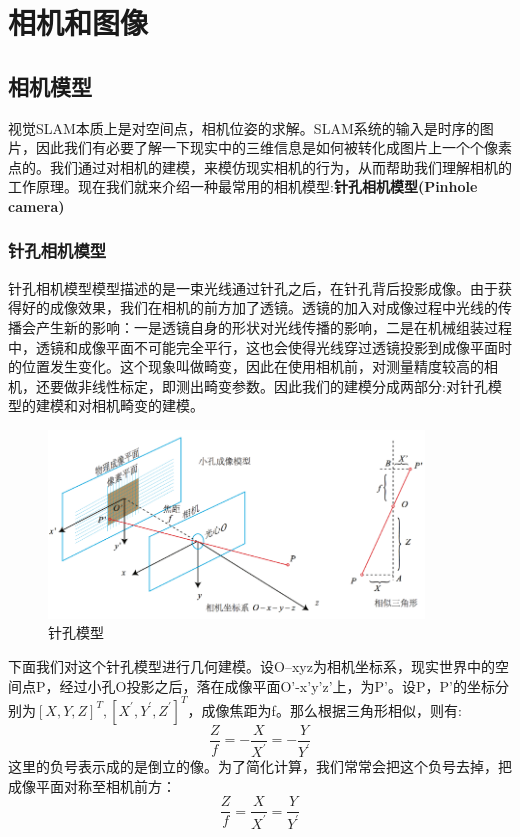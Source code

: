 \chapter{相机和图像}
\section{相机模型}
视觉SLAM本质上是对空间点，相机位姿的求解。SLAM系统的输入是时序的图片，因此我们有必要了解一下现实中的三维信息是如何被转化成图片上一个个像素点的。我们通过对相机的建模，来模仿现实相机的行为，从而帮助我们理解相机的工作原理。现在我们就来介绍一种最常用的相机模型:\textbf{针孔相机模型(Pinhole camera)}
\subsection{针孔相机模型}
针孔相机模型模型描述的是一束光线通过针孔之后，在针孔背后投影成像。由于获得好的成像效果，我们在相机的前方加了透镜。透镜的加入对成像过程中光线的传播会产生新的影响：一是透镜自身的形状对光线传播的影响，二是在机械组装过程中，透镜和成像平面不可能完全平行，这也会使得光线穿过透镜投影到成像平面时的位置发生变化。这个现象叫做畸变，因此在使用相机前，对测量精度较高的相机，还要做非线性标定，即测出畸变参数。因此我们的建模分成两部分:对针孔模型的建模和对相机畸变的建模。
\begin{figure}
	\centering
	\includegraphics[height=5cm]{figures/pinholemodule.png}
	\caption{针孔模型}
\end{figure}
下面我们对这个针孔模型进行几何建模。设O–xyz为相机坐标系，现实世界中的空间点P，经过小孔O投影之后，落在成像平面O'-x'y'z'上，为P'。设P，P'的坐标分别为$[X,Y,Z]^{T},\left[X^{\prime}, Y^{\prime}, Z^{\prime}\right]^{T}$，成像焦距为f。那么根据三角形相似，则有:
\begin{equation*}
\frac{Z}{f}=-\frac{X}{X^{\prime}}=-\frac{Y}{Y^{\prime}}
\end{equation*}
这里的负号表示成的是倒立的像。为了简化计算，我们常常会把这个负号去掉，把成像平面对称至相机前方：
\begin{equation}
\frac{Z}{f}=\frac{X}{X^{\prime}}=\frac{Y}{Y^{\prime}}\label{Ptochengxiang}
\end{equation}
